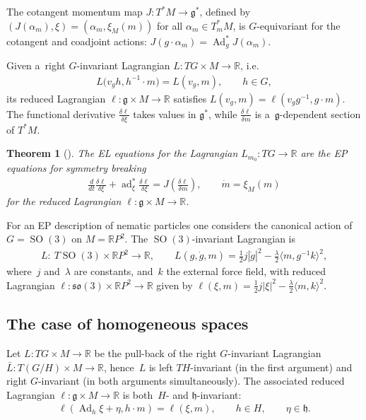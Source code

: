 \documentclass[pdftex]{sigma}
\numberwithin{equation}{section}
\newtheorem{Theorem}{Theorem}[section]
\begin{document}
The cotangent momentum map $J:T^*M\to \mathfrak g^*$, def\/ined by $(J(\alpha_m),\xi)=(\alpha_m,\xi_M(m))$ for all
$\alpha_m\in T^*_mM$, is $G$-equivariant for the cotangent and coadjoint actions:
$J(g\cdot\alpha_m)=\operatorname{Ad}^*_gJ(\alpha_m)$.

Given a~right $G$-invariant Lagrangian $L:TG\times M\rightarrow\mathbb{R}$, i.e.\
\begin{gather*}
L\big(v_gh,h^{-1}\cdot m\big)=L(v_g,m),
\qquad
h\in G,
\end{gather*}
its reduced Lagrangian {$\ell:\mathfrak{g}\times M\rightarrow\mathbb{R}$} satisf\/ies $L(v_g,m)=\ell(v_gg^{-1},g\cdot m)$.
The functional derivative $\frac{\delta\ell}{\delta\xi}$ takes values in $\mathfrak g^*$, while
$\frac{\delta\ell}{\delta m}$ is a~$\mathfrak g$-dependent section of $T^*M$.

\begin{Theorem}[\cite{GBT}]
The EL equations for the Lagrangian $L_{m_0}:TG\to\mathbb R$ are the EP equations for symmetry breaking
\begin{gather}
\label{epbreak}
{\frac{d}{dt}\frac{\delta\ell}{\delta\xi}+\operatorname{ad}^*_\xi\frac{\delta
\ell}{\delta\xi}=J\left(\frac{\delta\ell}{\delta m}\right)},
\qquad
\dot{m}=\xi_M(m)
\end{gather}
for the reduced Lagrangian $\ell:\mathfrak g\times M\to\mathbb R$.
\end{Theorem}

\begin{Example}
\label{nema}
For an EP description of nematic particles one considers the canonical action of $G=\operatorname{SO}(3)$ on $M=\mathbb
R P^2$.
The $\operatorname{SO}(3)$-invariant Lagrangian is
\begin{gather*}
L: \ T\operatorname{SO}(3)\times\mathbb R P^2\to\mathbb R,
\qquad
L(g,\dot g,m)=\frac12 j|\dot g|^2- \frac{\lambda}{2}\big\langle m, g^{-1}k\big\rangle^2,
\end{gather*}
where~$j$ and~$\lambda$ are constants, and~$k$ the external force f\/ield, with reduced Lagrangian
$\ell:\mathfrak{so}(3)\times\mathbb R P^2\to\mathbb R$ given by $\ell(\xi,m)=\frac12 j|\xi|^2-\frac{\lambda}{2}\langle
m, k\rangle^2$.
\end{Example}

\subsection{The case of homogeneous spaces}

Let $L:TG\times M\to\mathbb R$ be the pull-back of the right $G$-invariant Lagrangian $\bar L:T(G/H)\times M\to\mathbb
R$, hence~$L$ is left $TH$-invariant (in the f\/irst argument) and right $G$-invariant (in both arguments simultaneously).
The associated reduced Lagrangian $\ell:\mathfrak g\times M\to\mathbb R$ is both~$H$- and $\mathfrak h$-invariant:
\begin{gather}
\label{invinvinv}
\ell(\operatorname{Ad}_h\xi+\eta,h\cdot m)=\ell(\xi,m),
\qquad
h\in H,
\qquad
\eta\in\mathfrak h.
\end{gather}
\end{document}
